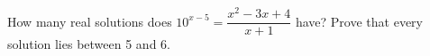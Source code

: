 How many real solutions does $10^{x-5}=\dfrac{x^2-3x+4}{x+1}$ have? Prove that every solution lies between 5 and 6.
